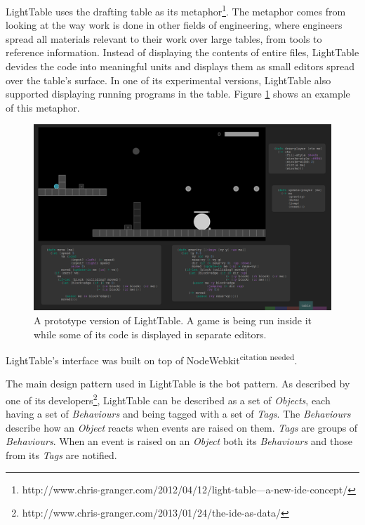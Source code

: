 \documentclass{./llncs2e/llncs}
\begin{document}
LightTable uses the drafting table as its metaphor\footnote{http://www.chris-granger.com/2012/04/12/light-table---a-new-ide-concept/}. The metaphor comes from looking at the way work is done in other fields of engineering, where engineers spread all materials relevant to their work over large tables, from tools to reference information. 
Instead of displaying the contents of entire files, LightTable devides the code into meaningful units and displays them as small editors spread over the table's surface. In one of its experimental versions, LightTable also supported displaying running programs in the table. Figure \ref{fig:lt:draft:table} shows an example of this metaphor.


\begin{figure}
  \centering
  \includegraphics[width=1.0\textwidth]{img/lt_game_example}
    \caption{A prototype version of LightTable. A game is being run inside it while some of its code is displayed in separate editors.}
  \label{fig:lt:draft:table}
\end{figure} 

LightTable's interface was built on top of NodeWebkit\textsuperscript{citation needed}.

The main design pattern used in LightTable is the \ac{bot} pattern. As described by one of its developers\footnote{http://www.chris-granger.com/2013/01/24/the-ide-as-data/}, LightTable can be described as a set of \emph{Objects}, each having a set of \emph{Behaviours} and being tagged with a set of \emph{Tags}. The \emph{Behaviours} describe how an \emph{Object} reacts when events are raised on them. \emph{Tags} are groups of \emph{Behaviours}. When an event is raised on an \emph{Object} both its \emph{Behaviours} and those from its \emph{Tags} are notified.
\end{document}
